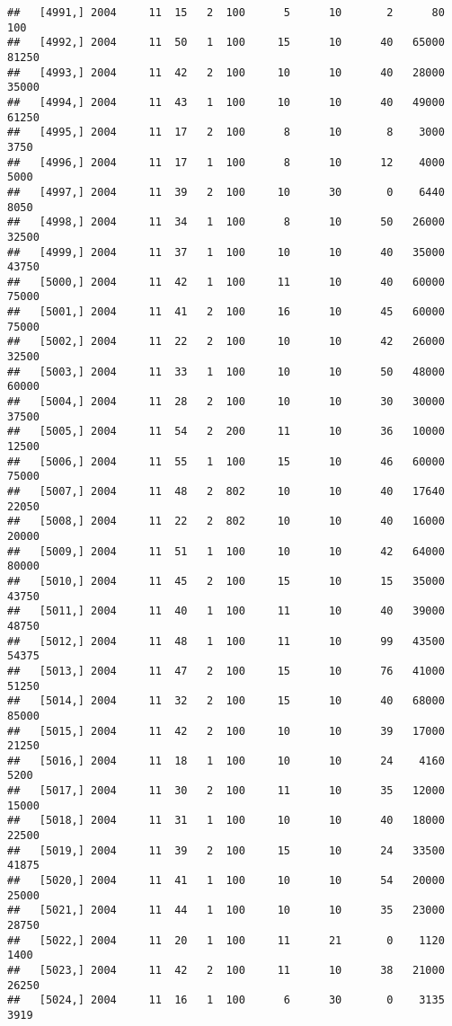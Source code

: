 \documentclass{article}\usepackage[]{graphicx}\usepackage[]{color}
\makeatletter
\newenvironment{kframe}{%
 \def\at@end@of@kframe{}%
 \ifinner\ifhmode%
  \def\at@end@of@kframe{\end{minipage}}%
  \begin{minipage}{\columnwidth}%
 \fi\fi%
 \def\FrameCommand##1{\hskip\@totalleftmargin \hskip-\fboxsep
 \colorbox{shadecolor}{##1}\hskip-\fboxsep
     \hskip-\linewidth \hskip-\@totalleftmargin \hskip\columnwidth}%
 \MakeFramed {\advance\hsize-\width
   \@totalleftmargin\z@ \linewidth\hsize
   \@setminipage}}%
 {\par\unskip\endMakeFramed%
 \at@end@of@kframe}
\newenvironment{knitrout}{}{} %
\makeatother
\begin{document}
\begin{knitrout}
\begin{kframe}
\begin{verbatim}
##   [4991,] 2004     11  15   2  100      5      10       2      80     100
##   [4992,] 2004     11  50   1  100     15      10      40   65000   81250
##   [4993,] 2004     11  42   2  100     10      10      40   28000   35000
##   [4994,] 2004     11  43   1  100     10      10      40   49000   61250
##   [4995,] 2004     11  17   2  100      8      10       8    3000    3750
##   [4996,] 2004     11  17   1  100      8      10      12    4000    5000
##   [4997,] 2004     11  39   2  100     10      30       0    6440    8050
##   [4998,] 2004     11  34   1  100      8      10      50   26000   32500
##   [4999,] 2004     11  37   1  100     10      10      40   35000   43750
##   [5000,] 2004     11  42   1  100     11      10      40   60000   75000
##   [5001,] 2004     11  41   2  100     16      10      45   60000   75000
##   [5002,] 2004     11  22   2  100     10      10      42   26000   32500
##   [5003,] 2004     11  33   1  100     10      10      50   48000   60000
##   [5004,] 2004     11  28   2  100     10      10      30   30000   37500
##   [5005,] 2004     11  54   2  200     11      10      36   10000   12500
##   [5006,] 2004     11  55   1  100     15      10      46   60000   75000
##   [5007,] 2004     11  48   2  802     10      10      40   17640   22050
##   [5008,] 2004     11  22   2  802     10      10      40   16000   20000
##   [5009,] 2004     11  51   1  100     10      10      42   64000   80000
##   [5010,] 2004     11  45   2  100     15      10      15   35000   43750
##   [5011,] 2004     11  40   1  100     11      10      40   39000   48750
##   [5012,] 2004     11  48   1  100     11      10      99   43500   54375
##   [5013,] 2004     11  47   2  100     15      10      76   41000   51250
##   [5014,] 2004     11  32   2  100     15      10      40   68000   85000
##   [5015,] 2004     11  42   2  100     10      10      39   17000   21250
##   [5016,] 2004     11  18   1  100     10      10      24    4160    5200
##   [5017,] 2004     11  30   2  100     11      10      35   12000   15000
##   [5018,] 2004     11  31   1  100     10      10      40   18000   22500
##   [5019,] 2004     11  39   2  100     15      10      24   33500   41875
##   [5020,] 2004     11  41   1  100     10      10      54   20000   25000
##   [5021,] 2004     11  44   1  100     10      10      35   23000   28750
##   [5022,] 2004     11  20   1  100     11      21       0    1120    1400
##   [5023,] 2004     11  42   2  100     11      10      38   21000   26250
##   [5024,] 2004     11  16   1  100      6      30       0    3135    3919

\end{verbatim}
\end{kframe}
\end{knitrout}
\end{document}
